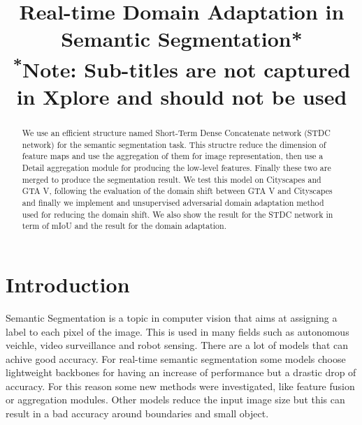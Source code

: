 \documentclass[conference]{IEEEtran}
\begin{document}
\title{Real-time Domain Adaptation in Semantic Segmentation*\\
{\footnotesize \textsuperscript{*}Note: Sub-titles are not captured in Xplore and
should not be used}
}

\author{
\and
{}
\and
{}
}

\maketitle

\begin{abstract}
We use an efficient structure named Short-Term Dense Concatenate network (STDC network) for the semantic segmentation task. This
structre reduce the dimension of feature maps and use the aggregation of them for image representation, then use a Detail aggregation
module for producing the low-level features. Finally these two are merged to produce the segmentation result. We test this model on 
Cityscapes and GTA V, following the evaluation of the domain shift between GTA V and Cityscapes and finally we implement and 
unsupervised adversarial domain adaptation method used for reducing the domain shift. We also show the result for the STDC network in
term of mIoU and the result for the domain adaptation. 
\end{abstract}


\section{Introduction}
Semantic Segmentation is a topic in computer vision that aims at assigning a label to each pixel of the image. This is used in many fields
such as autonomous veichle, video surveillance and robot sensing. There are a lot of models that can achive good accuracy. For real-time
semantic segmentation some models choose lightweight backbones for having an increase of performance but a drastic drop of accuracy. For
this reason some new methods were investigated, like feature fusion or aggregation modules. Other models reduce the input image size 
but this can result in a bad accuracy around boundaries and small object. 
\end{document}
